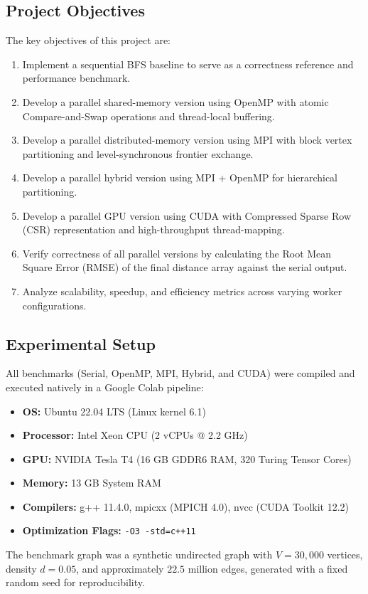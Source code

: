 \documentclass[12pt, a4paper]{article}
\begin{document}
\subsection{Project Objectives}
The key objectives of this project are:
\begin{enumerate}
    \item Implement a sequential BFS baseline to serve as a correctness reference and performance benchmark.
    \item Develop a parallel shared-memory version using OpenMP with atomic Compare-and-Swap operations and thread-local buffering.
    \item Develop a parallel distributed-memory version using MPI with block vertex partitioning and level-synchronous frontier exchange.
    \item Develop a parallel hybrid version using MPI + OpenMP for hierarchical partitioning.
    \item Develop a parallel GPU version using CUDA with Compressed Sparse Row (CSR) representation and high-throughput thread-mapping.
    \item Verify correctness of all parallel versions by calculating the Root Mean Square Error (RMSE) of the final distance array against the serial output.
    \item Analyze scalability, speedup, and efficiency metrics across varying worker configurations.
\end{enumerate}

\subsection{Experimental Setup}
All benchmarks (Serial, OpenMP, MPI, Hybrid, and CUDA) were compiled and executed natively in a Google Colab pipeline:
\begin{itemize}[leftmargin=*]
    \item \textbf{OS:} Ubuntu 22.04 LTS (Linux kernel 6.1)
    \item \textbf{Processor:} Intel Xeon CPU (2 vCPUs @ 2.2 GHz)
    \item \textbf{GPU:} NVIDIA Tesla T4 (16 GB GDDR6 RAM, 320 Turing Tensor Cores)
    \item \textbf{Memory:} 13 GB System RAM
    \item \textbf{Compilers:} g++ 11.4.0, mpicxx (MPICH 4.0), nvcc (CUDA Toolkit 12.2)
    \item \textbf{Optimization Flags:} \texttt{-O3 -std=c++11}
\end{itemize}
The benchmark graph was a synthetic undirected graph with $V = 30,000$ vertices, density $d = 0.05$, and approximately $22.5$ million edges, generated with a fixed random seed for reproducibility.
\end{document}
